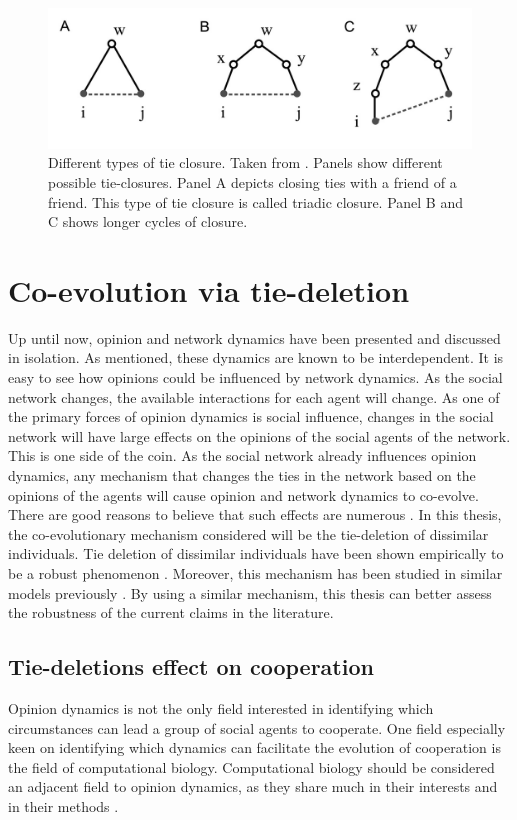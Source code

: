 \documentclass[11pt]{article}
\begin{document}
\begin{figure}[H]
    \centering
    \includegraphics[width=.8\linewidth]{../plots/references/kossinets_watts.jpeg}
  \caption{Different types of tie closure. Taken from \protect\citeauthor{kossinets_origins_2009} \protect\citeyear{kossinets_origins_2009}. Panels show different possible tie-closures. Panel A depicts closing ties with a friend of a friend. This type of tie closure is called triadic closure. Panel B and C shows longer cycles of closure.}
  \label{fig:tie_closure}
\end{figure}

\section{Co-evolution via tie-deletion}
Up until now, opinion and network dynamics have been presented and discussed in isolation. As mentioned, these dynamics are known to be interdependent.
It is easy to see how opinions could be influenced by network dynamics. 
As the social network changes, the available interactions for each agent will change. 
As one of the primary forces of opinion dynamics is social influence, changes in the social network will have large effects on the opinions of the social agents of the network. 
This is one side of the coin. As the social network already influences opinion dynamics, any mechanism that changes the ties in the network based on the opinions of the agents will cause opinion and network dynamics to co-evolve. 
There are good reasons to believe that such effects are numerous \cite{bener_empirical_2016, kossinets_origins_2009, levin_dynamics_2021}.
In this thesis, the co-evolutionary mechanism considered will be the tie-deletion of dissimilar individuals. 
Tie deletion of dissimilar individuals have been shown empirically to be a robust phenomenon \cite{kossinets_origins_2009, bener_empirical_2016}. Moreover, this mechanism has been studied in similar models previously \cite{santos_cooperation_2006,sasahara_social_2021}. 
By using a similar mechanism, this thesis can better assess the robustness of the current claims in the literature. 

\subsection{Tie-deletions effect on cooperation}
Opinion dynamics is not the only field interested in identifying which circumstances can lead a group of social agents to cooperate. One field especially keen on identifying which dynamics can facilitate the evolution of cooperation is the field of computational biology. Computational biology should be considered an adjacent field to opinion dynamics, as they share much in their interests and in their methods \cite{dakin_dynamic_2018,melamed_strong_2016,pepper_mechanism_2002,santos_cooperation_2006, smaldino2019social}. 
\end{document}
